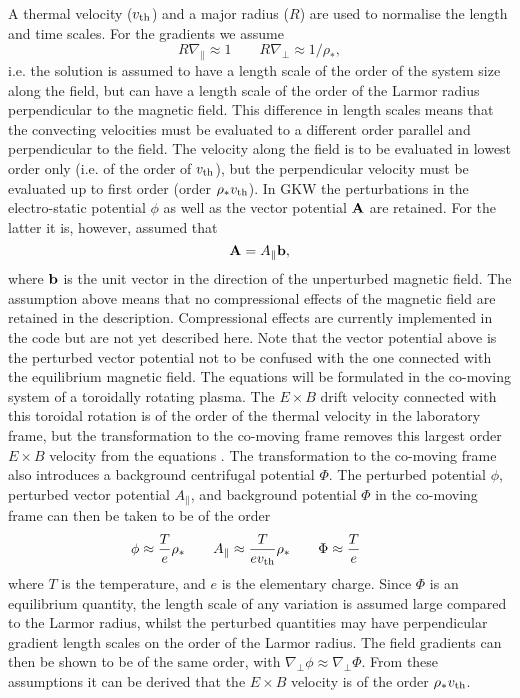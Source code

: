 A thermal velocity ($v_{\rm th}$) and a major radius ($R$) are used to normalise the length and 
time scales. For the gradients we assume 
\begin{equation} 
R \nabla_\parallel  \approx 1 \qquad 
R \nabla_\perp \approx 1/ \rho_*,
\end{equation} 
i.e. the solution is assumed to have a length scale of the order of the system size along the 
field, but can have a length scale of the order of the Larmor radius perpendicular to the 
magnetic field. 
This difference in length scales means that the convecting velocities must be evaluated to a 
different order parallel and perpendicular to the field. 
The velocity along the field is to be evaluated in lowest order only (i.e. of the order of $v_{\rm th}$), but
the perpendicular velocity must be evaluated up to first order (order $\rho_* v_{\rm th}$). 
In GKW the perturbations in the electro-static potential $\phi$ as well as the vector potential ${\bf A}$ are 
retained.
For the latter it is, however, assumed that 
\begin{equation} 
{\bf A} = A_\parallel {\bf b} ,
\end{equation}
where ${\bf b}$ is the unit vector in the direction of the unperturbed magnetic field. 
The assumption above means that no compressional effects of the magnetic field are retained in the 
description.
Compressional effects are currently implemented in the code but are not yet described here.  
Note that the vector potential above is the perturbed vector potential not to be confused with the one 
connected with the equilibrium magnetic field.
The equations will be formulated in the co-moving system of a toroidally rotating plasma. 
The $E \times B$ drift velocity connected with this toroidal rotation is of the order of the thermal 
velocity in the laboratory frame, but the transformation to the co-moving frame removes this largest order $E \times B$ velocity from the 
equations \cite{PEE09,Casson-Thesis}. The transformation to the co-moving frame also introduces a background centrifugal potential $\Phi$.
The perturbed potential $\phi$, perturbed vector potential $A_\parallel$, and background potential $\Phi$
in the co-moving frame can then be taken to be of the order 
\begin{equation} 
\phi \approx {T \over e} \rho_* \qquad 
A_\parallel \approx {T \over e v_{\rm th}} \rho_*
\qquad
\Phi \approx {T \over e} \qquad 
\label{fieldordering}
\end{equation}
where $T$ is the temperature, and $e$ is the elementary charge. 
Since $\Phi$ is an equilibrium quantity, the length scale of any variation is assumed large compared
to the Larmor radius, whilst the perturbed quantities may have perpendicular gradient length scales on the order of the Larmor radius.  
The field gradients can then be shown to be of the same order, with $\nabla_\perp \phi \approx \nabla_\perp \Phi$.  
From these assumptions it can be derived that the $E \times B$ velocity is of the order $\rho_* v_{\rm th}$. 

